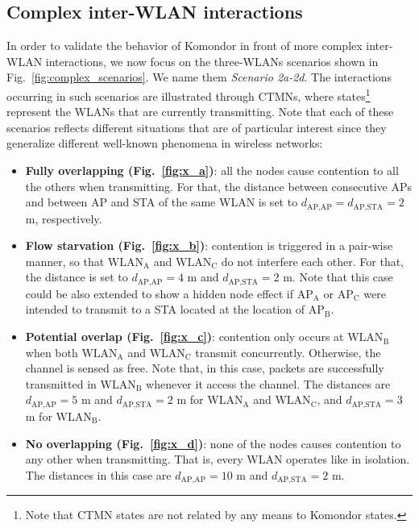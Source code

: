 \documentclass[conference]{IEEEtran}
\begin{document}
	\subsection{Complex inter-WLAN interactions}
	\label{section:complex_scenarios}
	In order to validate the behavior of Komondor in front of more complex inter-WLAN interactions, we now focus on the three-WLANs scenarios shown in Fig.~\ref{fig:complex_scenarios}. We name them \textit{Scenario 2a-2d}. The interactions occurring in such scenarios are illustrated through CTMNs, where states\footnote{Note that CTMN states are not related by any means to Komondor states.} represent the WLANs that are currently transmitting. Note that each of these scenarios reflects different situations that are of particular interest since they generalize different well-known phenomena in wireless networks:
	\begin{itemize}
		
		\item \textbf{Fully overlapping (Fig.~\ref{fig:x_a})}: all the nodes cause contention to all the others when transmitting. For that, the distance between consecutive APs and between AP and STA of the same WLAN is set to $d_{\text{AP,AP}} = d_{\text{AP,STA}} = 2$ m, respectively.
		
		\item \textbf{Flow starvation (Fig.~\ref{fig:x_b})}: contention is triggered in a pair-wise manner, so that $\text{WLAN}_\text{A}$ and $\text{WLAN}_\text{C}$ do not interfere each other. For that, the distance is set to $d_{\text{AP,AP}} = 4$ m and $d_{\text{AP,STA}} = 2$ m. Note that this case could be also extended to show a hidden node effect if $\text{AP}_\text{A}$ or $\text{AP}_\text{C}$ were intended to transmit to a STA located at the location of $\text{AP}_\text{B}$.
		
		\item \textbf{Potential overlap (Fig.~\ref{fig:x_c})}:
		contention only occurs at $\text{WLAN}_\text{B}$ when both $\text{WLAN}_\text{A}$ and $\text{WLAN}_\text{C}$ transmit concurrently. Otherwise, the channel is sensed as free. Note that, in this case, packets are successfully transmitted in $\text{WLAN}_\text{B}$ whenever it access the channel. The distances are $d_{\text{AP,AP}} = 5$ m and $d_{\text{AP,STA}} = 2$ m for $\text{WLAN}_\text{A}$ and $\text{WLAN}_\text{C}$, and $d_{\text{AP,STA}} = 3$ m for $\text{WLAN}_\text{B}$.
		
		\item \textbf{No overlapping (Fig.~\ref{fig:x_d})}: none of the nodes causes contention to any other when transmitting. That is, every WLAN operates like in isolation. The distances in this case are $d_{\text{AP,AP}} = 10$ m and $d_{\text{AP,STA}} = 2$ m.
	\end{itemize}
	
\end{document}
